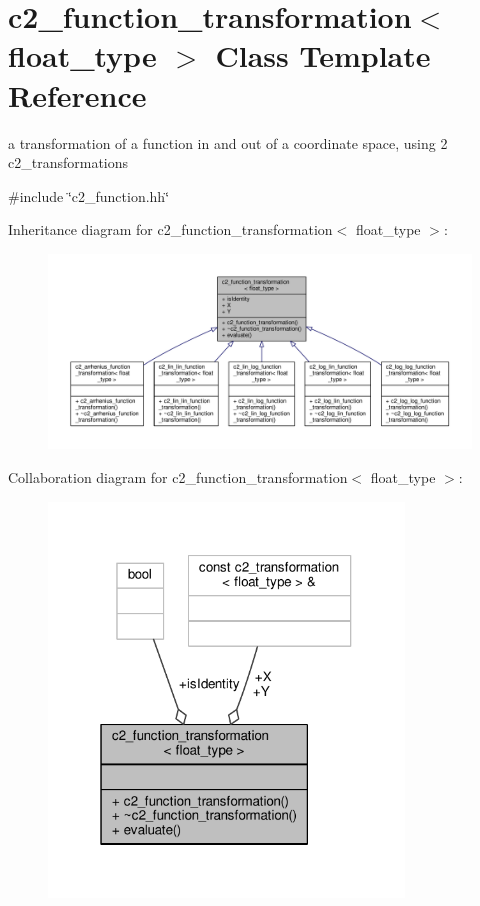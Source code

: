 \hypertarget{classc2__function__transformation}{}\section{c2\+\_\+function\+\_\+transformation$<$ float\+\_\+type $>$ Class Template Reference}
\label{classc2__function__transformation}


a transformation of a function in and out of a coordinate space, using 2 c2\+\_\+transformations  




{\ttfamily \#include \char`\"{}c2\+\_\+function.\+hh\char`\"{}}



Inheritance diagram for c2\+\_\+function\+\_\+transformation$<$ float\+\_\+type $>$\+:
\nopagebreak
\begin{figure}[H]
\begin{center}
\leavevmode
\includegraphics[width=350pt]{classc2__function__transformation__inherit__graph}
\end{center}
\end{figure}


Collaboration diagram for c2\+\_\+function\+\_\+transformation$<$ float\+\_\+type $>$\+:
\nopagebreak
\begin{figure}[H]
\begin{center}
\leavevmode
\includegraphics[width=268pt]{classc2__function__transformation__coll__graph}
\end{center}
\end{figure}
